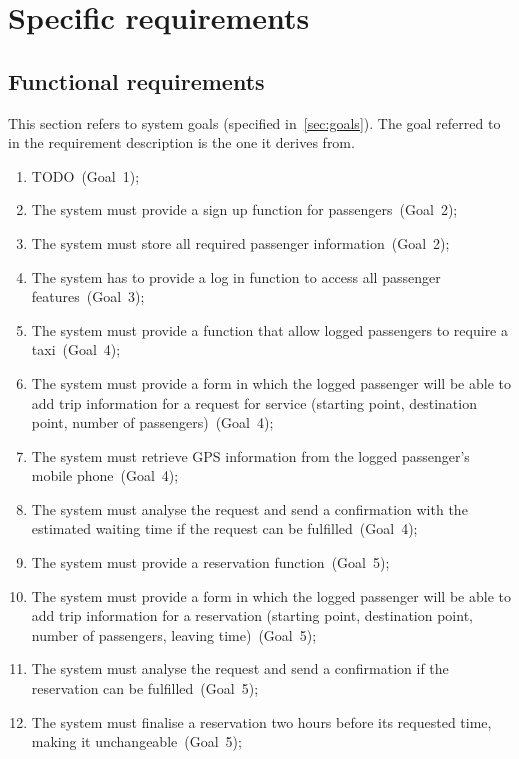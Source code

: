\chapter{Specific requirements}

\section{Functional requirements}
\label{sec:requirements}
This section refers to system goals (specified in~\autoref{sec:goals}). The goal referred to in the requirement description is the one it derives from.

\begin{enumerate}

\item TODO~(Goal~1);

\item The system must provide a sign up function for passengers~(Goal~2);
\item The system must store all required passenger information~(Goal~2); 

\item The system has to provide a log in function to access all passenger features~(Goal~3);

\item The system must provide a function that allow logged passengers to require a taxi~(Goal~4);
\item The system must provide a form in which the logged passenger will be able to add trip information for a request for service (starting point, destination point, number of passengers)~(Goal~4);
\item The system must retrieve GPS information from the logged passenger's mobile phone~(Goal~4);
\item The system must analyse the request and send a confirmation with the estimated waiting time if the request can be fulfilled~(Goal~4);

\item The system must provide a reservation function~(Goal~5);
\item The system must provide a form in which the logged passenger will be able to add trip information for a reservation (starting point, destination point, number of passengers, leaving time)~(Goal~5);
\item The system must analyse the request and send a confirmation if the reservation can be fulfilled~(Goal~5);
\item The system must finalise a reservation two hours before its requested time, making it unchangeable~(Goal~5);


\end{enumerate}
